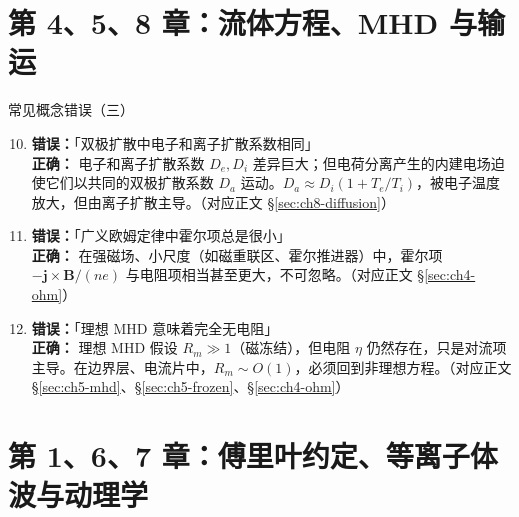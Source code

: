 \documentclass[12pt,a4paper,openany,oneside]{book}
\newcommand{\vect}[1]{\bm{#1}}
\begin{document}
\section{第 4、5、8 章：流体方程、MHD 与输运}

\begin{warning}{常见概念错误（三）}{}
\begin{enumerate}
\setcounter{enumi}{9}
\item \textbf{错误：}「双极扩散中电子和离子扩散系数相同」\\
\textbf{正确：} 电子和离子扩散系数 $D_e, D_i$ 差异巨大；但电荷分离产生的内建电场迫使它们以共同的双极扩散系数 $D_a$ 运动。$D_a\approx D_i(1+T_e/T_i)$，被电子温度放大，但由离子扩散主导。（对应正文 \S\ref{sec:ch8-diffusion}）

\item \textbf{错误：}「广义欧姆定律中霍尔项总是很小」\\
\textbf{正确：} 在强磁场、小尺度（如磁重联区、霍尔推进器）中，霍尔项 $-\vect{j}\times\vect{B}/(ne)$ 与电阻项相当甚至更大，不可忽略。（对应正文 \S\ref{sec:ch4-ohm}）

\item \textbf{错误：}「理想 MHD 意味着完全无电阻」\\
\textbf{正确：} 理想 MHD 假设 $R_m\gg 1$（磁冻结），但电阻 $\eta$ 仍然存在，只是对流项主导。在边界层、电流片中，$R_m\sim O(1)$，必须回到非理想方程。（对应正文 \S\ref{sec:ch5-mhd}、\S\ref{sec:ch5-frozen}、\S\ref{sec:ch4-ohm}）
\end{enumerate}
\end{warning}


\section{第 1、6、7 章：傅里叶约定、等离子体波与动理学}
\end{document}
